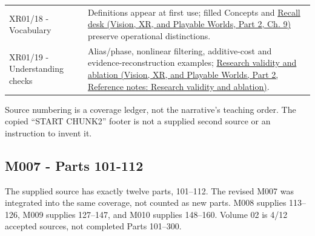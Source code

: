 {\begin{longtable}[]{@{}
  >{\raggedright\arraybackslash}p{}
  >{\raggedright\arraybackslash}p{}@{}}
XR01/18 - Vocabulary & Definitions appear at first use; filled Concepts and \href{../07-Vision-XR-and-Playable-Worlds-P02/main.pdf\#04-visual-computing-ii-ch042-teach-the-distinctions-from-a-blank-board}{Recall desk (Vision, XR, and Playable Worlds, Part 2, Ch. 9)} preserve operational distinctions. \\
XR01/19 - Understanding checks & Alias/phase, nonlinear filtering, additive-cost and evidence-reconstruction examples; \href{../07-Vision-XR-and-Playable-Worlds-P02/main.pdf\#appendix-65788587ef78}{Research validity and ablation (Vision, XR, and Playable Worlds, Part 2, Reference notes: Research validity and ablation)}. \\
\end{longtable}
}

Source numbering is a coverage ledger, not the narrative's teaching order. The copied ``START CHUNK2'' footer is not a supplied second source or an instruction to invent it.

\subsection{M007 - Parts 101-112}\label{appendix-fd090d982a15-m007---parts-101-112}

\hypertarget{appendix-fd090d982a15-m007---parts-101-112}{}

The supplied source has exactly twelve parts, 101--112. The revised M007 was integrated into the same coverage, not counted as new parts. M008 supplies 113--126, M009 supplies 127--147, and M010 supplies 148--160. Volume 02 is 4/12 accepted sources, not completed Parts 101--300.

